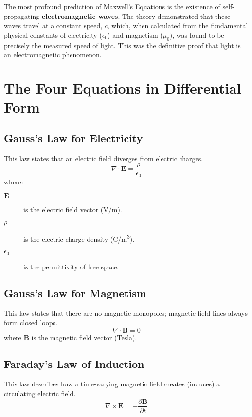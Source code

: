 \begin{keyconcept}
    The most profound prediction of Maxwell's Equations is the existence of self-propagating \textbf{electromagnetic waves}. The theory demonstrated that these waves travel at a constant speed, $c$, which, when calculated from the fundamental physical constants of electricity ($\epsilon_0$) and magnetism ($\mu_0$), was found to be precisely the measured speed of light. This was the definitive proof that light is an electromagnetic phenomenon.
\end{keyconcept}

\section{The Four Equations in Differential Form}

\subsection{Gauss's Law for Electricity}
This law states that an electric field diverges from electric charges.
\begin{equation}
    \nabla \cdot \mathbf{E} = \frac{\rho}{\epsilon_0}
    \label{eq:gauss_electric}
\end{equation}
where:
\begin{description}
    \item[$\mathbf{E}$] is the electric field vector (\unit{V/m}).
    \item[$\rho$] is the electric charge density (\unit{C/m^3}).
    \item[$\epsilon_0$] is the permittivity of free space.
\end{description}

\subsection{Gauss's Law for Magnetism}
This law states that there are no magnetic monopoles; magnetic field lines always form closed loops.
\begin{equation}
    \nabla \cdot \mathbf{B} = 0
    \label{eq:gauss_magnetic}
\end{equation}
where $\mathbf{B}$ is the magnetic field vector (Tesla).

\subsection{Faraday's Law of Induction}
This law describes how a time-varying magnetic field creates (induces) a circulating electric field.
\begin{equation}
    \nabla \times \mathbf{E} = -\frac{\partial \mathbf{B}}{\partial t}
    \label{eq:faraday}
\end{equation}

